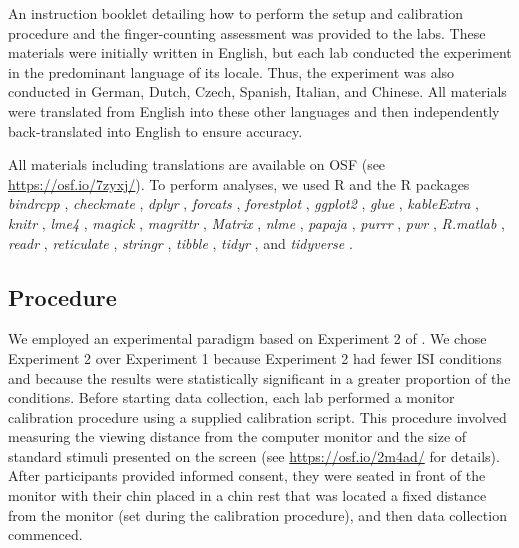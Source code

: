 \documentclass[man,floatsintext]{apa6}
\theoremstyle{definition}
\theoremstyle{definition}
\theoremstyle{definition}
\theoremstyle{remark}
\begin{document}
An instruction booklet detailing how to perform the setup and
calibration procedure and the finger-counting assessment was provided to
the labs. These materials were initially written in English, but each
lab conducted the experiment in the predominant language of its locale.
Thus, the experiment was also conducted in German, Dutch, Czech,
Spanish, Italian, and Chinese. All materials were translated from
English into these other languages and then independently
back-translated into English to ensure accuracy.

All materials including translations are available on OSF (see
\url{https://osf.io/7zyxj/}). To perform analyses, we used R
\autocite[Version 3.5.1;][]{R-base} and the R packages \emph{bindrcpp}
\autocite[Version 0.2.2;][]{R-bindrcpp}, \emph{checkmate}
\autocite[Version 1.8.5;][]{R-checkmate}, \emph{dplyr} \autocite[Version
0.7.6;][]{R-dplyr}, \emph{forcats} \autocite[Version
0.3.0;][]{R-forcats}, \emph{forestplot} \autocite[Version
1.7.2;][]{R-forestplot}, \emph{ggplot2} \autocite[Version
3.0.0;][]{R-ggplot2}, \emph{glue} \autocite[Version 1.3.0;][]{R-glue},
\emph{kableExtra} \autocite[Version 0.9.0;][]{R-kableExtra},
\emph{knitr} \autocite[Version 1.20;][]{R-knitr}, \emph{lme4}
\autocite[Version 1.1.18.1;][]{R-lme4}, \emph{magick} \autocite[Version
1.9;][]{R-magick}, \emph{magrittr} \autocite[Version
1.5;][]{R-magrittr}, \emph{Matrix} \autocite[Version
1.2.14;][]{R-Matrix}, \emph{nlme} \autocite[Version 3.1.137;][]{R-nlme},
\emph{papaja} \autocite[Version 0.1.0.9842;][]{R-papaja}, \emph{purrr}
\autocite[Version 0.2.5;][]{R-purrr}, \emph{pwr} \autocite[Version
1.2.2;][]{R-pwr}, \emph{R.matlab} \autocite[Version
3.6.2;][]{R-R.matlab}, \emph{readr} \autocite[Version
1.1.1;][]{R-readr}, \emph{reticulate} \autocite[Version
1.10;][]{R-reticulate}, \emph{stringr} \autocite[Version
1.3.1;][]{R-stringr}, \emph{tibble} \autocite[Version
1.4.2;][]{R-tibble}, \emph{tidyr} \autocite[Version 0.8.1;][]{R-tidyr},
and \emph{tidyverse} \autocite[Version 1.2.1;][]{R-tidyverse}.

\subsection{Procedure}\label{procedure}

We employed an experimental paradigm based on Experiment 2 of
\textcite{Fischer:2003ju}. We chose Experiment 2 over Experiment 1
because Experiment 2 had fewer ISI conditions and because the results
were statistically significant in a greater proportion of the
conditions. Before starting data collection, each lab performed a
monitor calibration procedure using a supplied calibration script. This
procedure involved measuring the viewing distance from the computer
monitor and the size of standard stimuli presented on the screen (see
\url{https://osf.io/2m4ad/} for details). After participants provided
informed consent, they were seated in front of the monitor with their
chin placed in a chin rest that was located a fixed distance from the
monitor (set during the calibration procedure), and then data collection
commenced.
\end{document}
